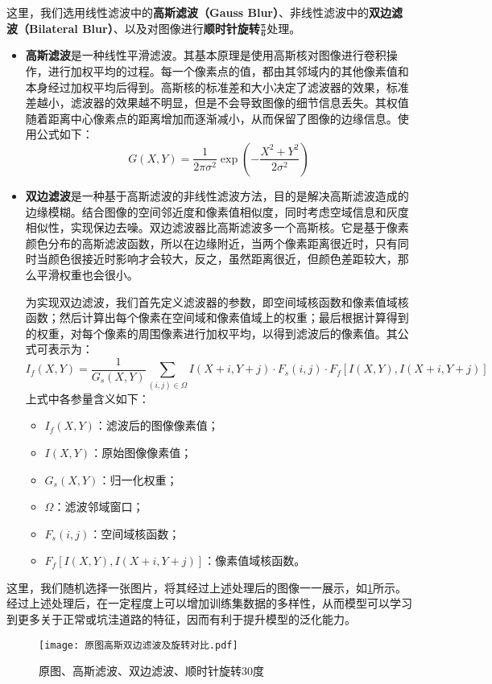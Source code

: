 \documentclass{MathorCupmodeling}
\begin{document}
	这里，我们选用线性滤波中的\textbf{高斯滤波（Gauss Blur）}、非线性滤波中的\textbf{双边滤波（Bilateral Blur）}、以及对图像进行\textbf{顺时针旋转$\boldsymbol{\frac{\pi}{6}}$}处理。
	\begin{itemize}
		\item \textbf{高斯滤波}是一种线性平滑滤波。其基本原理是使用高斯核对图像进行卷积操作，进行加权平均的过程。每一个像素点的值，都由其邻域内的其他像素值和本身经过加权平均后得到。高斯核的标准差和大小决定了滤波器的效果，标准差越小，滤波器的效果越不明显，但是不会导致图像的细节信息丢失。其权值随着距离中心像素点的距离增加而逐渐减小，从而保留了图像的边缘信息。使用公式如下：
		\begin{equation}
			G\left(X,Y\right)=\frac{1}{2\pi\sigma^2}\exp\left(-\frac{X^2+Y^2}{2\sigma^2}\right)
		\end{equation}
		\item \textbf{双边滤波}是一种基于高斯滤波的非线性滤波方法，目的是解决高斯滤波造成的边缘模糊。结合图像的空间邻近度和像素值相似度，同时考虑空域信息和灰度相似性，实现保边去噪。双边滤波器比高斯滤波多一个高斯核。它是基于像素颜色分布的高斯滤波函数，所以在边缘附近，当两个像素距离很近时，只有同时当颜色很接近时影响才会较大，反之，虽然距离很近，但颜色差距较大，那么平滑权重也会很小。
		
		为实现双边滤波，我们首先定义滤波器的参数，即空间域核函数和像素值域核函数；然后计算出每个像素在空间域和像素值域上的权重；最后根据计算得到的权重，对每个像素的周围像素进行加权平均，以得到滤波后的像素值。其公式可表示为：
		\begin{equation}
			I_f\left( X,Y \right) =\frac{1}{G_s\left( X,Y \right)}\sum_{\left( i,j \right) \in \Omega}{I\left( X+i,Y+j \right) \cdot F_s\left( i,j \right)}\cdot F_f\left[ I\left( X,Y \right) ,I\left( X+i,Y+j \right) \right] 
		\end{equation}
		上式中各参量含义如下：
		\begin{itemize}
			\item $I_f\left(X,Y\right)$：滤波后的图像像素值；
			\item $I\left(X,Y\right)$：原始图像像素值；
			\item $G_s\left(X,Y\right)$：归一化权重；
			\item $\Omega$：滤波邻域窗口；
			\item $F_s\left(i,j\right)$：空间域核函数；
			\item $F_f\left[ I\left( X,Y \right) ,I\left( X+i,Y+j \right) \right]$：像素值域核函数。
		\end{itemize}
	\end{itemize}
\newpage
	这里，我们随机选择一张图片，将其经过上述处理后的图像一一展示，如\textcolor{blue}{\cref{fig:原图高斯双边滤波及旋转对比}}所示。经过上述处理后，在一定程度上可以增加训练集数据的多样性，从而模型可以学习到更多关于正常或坑洼道路的特征，因而有利于提升模型的泛化能力。
	\begin{figure}[H]
		\centering
		\texttt{[image: 原图高斯双边滤波及旋转对比.pdf]}
		\caption{原图、高斯滤波、双边滤波、顺时针旋转30度}
		\label{fig:原图高斯双边滤波及旋转对比}
	\end{figure}
\end{document}
